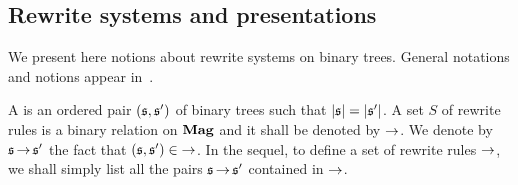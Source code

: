 \subsection{Rewrite systems and presentations}
We present here notions about rewrite systems on binary trees. General
notations and notions appear in~\cite{BN98}.
\medbreak

A  is an ordered pair $(\mathfrak{s}, \mathfrak{s}')$ of binary trees
such that $|\mathfrak{s}| = |\mathfrak{s}'|$. A set $S$ of rewrite rules is a binary
relation on $\mathbf{Mag}$ and it shall be denoted by $\operatorname{\to}$. We denote by
$\mathfrak{s} \operatorname{\to} \mathfrak{s}'$ the fact that $(\mathfrak{s}, \mathfrak{s}') \in \operatorname{\to}$. In the sequel,
to define a set of rewrite rules $\operatorname{\to}$, we shall simply list all
the pairs $\mathfrak{s} \operatorname{\to} \mathfrak{s}'$ contained in $\operatorname{\to}$.
\medbreak

